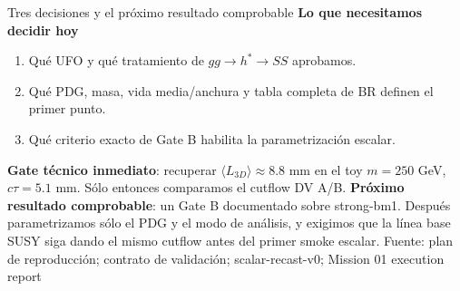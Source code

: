 \documentclass[aspectratio=169,10pt]{beamer}
\newcommand{\source}[1]{\vfill{\tiny\color{gray}Fuente: #1}}
\begin{document}
\begin{frame}{Tres decisiones y el próximo resultado comprobable}
  \textbf{Lo que necesitamos decidir hoy}
  \begin{enumerate}
    \item Qué UFO y qué tratamiento de $gg\to h^*\to SS$ aprobamos.
    \item Qué PDG, masa, vida media/anchura y tabla completa de BR definen
          el primer punto.
    \item Qué criterio exacto de Gate B habilita la parametrización escalar.
  \end{enumerate}
  \vspace{0.7em}
  \textbf{Gate técnico inmediato}: recuperar $\langle L_{3D}\rangle\approx 8.8$ mm en el
  toy $m=250$ GeV, $c\tau=5.1$ mm. Sólo entonces comparamos el cutflow DV A/B.
  \vspace{0.5em}
  \textbf{Próximo resultado comprobable}: un Gate B documentado sobre strong-bm1.
  Después parametrizamos sólo el PDG y el modo de análisis, y exigimos que la
  línea base SUSY siga dando el mismo cutflow antes del primer smoke escalar.
  \source{plan de reproducción; contrato de validación; scalar-recast-v0; Mission 01 execution report}
\end{frame}
\end{document}
